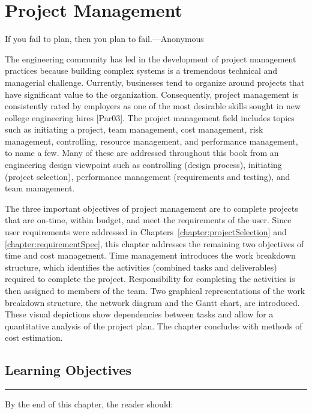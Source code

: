 \chapter{ Project Management}
\label{chapter:projectManagement}
\graphicspath{ {./chapter10/Fig} }

\begin{itquote}
If you fail to plan, then you plan to fail.---Anonymous
\end{itquote}

The engineering community has led in the development of project
management practices because building complex systems is a tremendous
technical and managerial challenge. Currently, businesses tend to
organize around projects that have significant value to the
organization. Consequently, project management is consistently rated by
employers as one of the most desirable skills sought in new college
engineering hires {[}Par03{]}. The project management field includes
topics such as initiating a project, team management, cost management,
risk management, controlling, resource management, and performance
management, to name a few. Many of these are addressed throughout this
book from an engineering design viewpoint such as controlling (design
process), initiating (project selection), performance management
(requirements and testing), and team management.

The three important objectives of project management are to complete
projects that are on-time, within budget, and meet the requirements of
the user. Since user requirements were addressed in 
Chapters~\ref{chapter:projectSelection} and \ref{chapter:requirementSpec},
this chapter addresses the remaining two objectives of time and cost
management. Time management introduces the work breakdown structure,
which identifies the activities (combined tasks and deliverables)
required to complete the project. Responsibility for completing the
activities is then assigned to members of the team. Two graphical
representations of the work breakdown structure, the network diagram and
the Gantt chart, are introduced. These visual depictions show
dependencies between tasks and allow for a quantitative analysis of the
project plan. The chapter concludes with methods of cost estimation.

\section*{Learning Objectives}
\noindent\rule{\linewidth}{1pt}
By the end of this chapter, the reader should:

